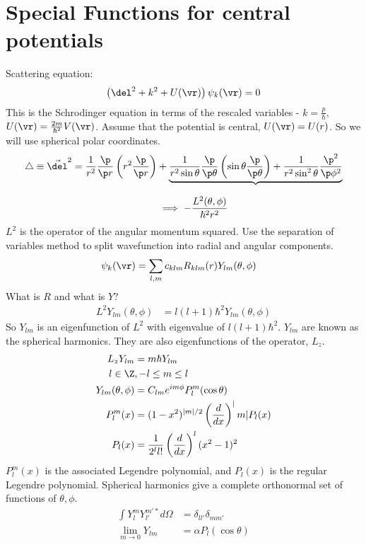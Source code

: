 \documentclass[a4paper, 11pt, normalem]{report}
\begin{document}
\chapter{Special Functions for central potentials}
Scattering equation:
\begin{equation}
    \left(\del^2 + k^2 + U(\vr)\right)\psi_k(\vr) = 0
\end{equation}
This is the Schrodinger equation in terms of the rescaled variables - $k = \frac{p}{\hbar}$, $U(\vr) = \frac{2m}{\hbar^2}V(\vr)$.
Assume that the potential is central, $U(\vr) = U(r)$.
So we will use spherical polar coordinates. 
\begin{align}
    \bigtriangleup \equiv \vec{\del}^2 = \frac{1}{r^2}\frac{\p}{\p r}\left(r^2\frac{\p}{\p r}\right) &+ \underbrace{\frac{1}{r^2\sin\theta}\frac{\p}{\p\theta}\left(\sin\theta\frac{\p}{\p\theta}\right) + \frac{1}{r^2\sin^2\theta}\frac{\p^2}{\p\phi^2}}_{} \\
    &\implies -\frac{L^2(\theta,\phi)}{\hbar^2r^2} 
\end{align}
$L^2$ is the operator of the angular momentum squared. 
Use the separation of variables method to split wavefunction into radial and angular components.
\begin{align}
    \psi_k(\vr) &= \sum_{l,m} c_{klm} R_{klm}(r)Y_{lm}(\theta,\phi)
\end{align}
What is $R$ and what is $Y$?
\begin{align}
    L^2Y_{lm}(\theta,\phi) &= l(l+1)\hbar^2 Y_{lm}(\theta,\phi)
\end{align}
So $Y_{lm}$ is an eigenfunction of $L^2$ with eigenvalue of $l(l+1)\hbar^2$.
$Y_{lm}$ are known as the spherical harmonics.
They are also eigenfunctions of the operator, $L_z$.
\begin{align}
    L_zY_{lm} &= m\hbar Y_{lm} \\
    l\in\Z &, -l \leq m \leq l \\
    Y_{lm}(\theta,\phi) &= C_{lm}e^{im\phi}P_l^m(\cos\theta) \\
    P_l^m(x) &= (1-x^2)^{|m|/2}\left(\frac{d}{dx}\right)^|m| P_l(x) \\
    P_l(x) &= \frac{1}{2^ll!}\left(\frac{d}{dx}\right)^l (x^2-1)^2
\end{align}
$P_l^m(x)$ is the associated Legendre polynomial, and $P_l(x)$ is the regular Legendre polynomial.
Spherical harmonics give a complete orthonormal set of functions of $\theta,\phi$.
\begin{align}
    \int Y^m_lY_{l'}^{m'*} d\Omega &= \delta_{ll'}\delta_{mm'} \\
    \lim_{m\to0} Y_{lm} &= \alpha P_l(\cos\theta)
\end{align}
\end{document}
